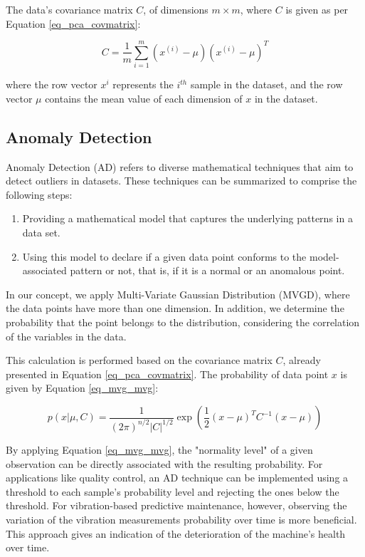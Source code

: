 \documentclass[conference]{IEEEtran}
\begin{document}
The data's covariance matrix $C$, of dimensions $m \times m$, where $C$ is given as per Equation \ref{eq_pca_covmatrix}:

\begin{equation}
	\label{eq_pca_covmatrix}
	C=\frac{1}{m}\sum_{i = 1}^{m}(x^{(i)}-\mu)(x^{(i)}-\mu)^{T}   
\end{equation}

where the row vector $x^{i}$ represents the $i^{th}$ sample in the dataset, and the row vector $\mu$ contains the mean value of each dimension of $x$ in the dataset. 

\subsection{Anomaly Detection}
\label{sec_anomaly_detection}
Anomaly Detection (AD) refers to diverse mathematical techniques that aim to detect outliers in datasets. These techniques can be summarized to comprise the following steps: 

\begin{enumerate}
	\item Providing a mathematical model that captures the underlying patterns in a data set.
	\item Using this model to declare if a given data point conforms to the model-associated pattern or not, that is, if it is a normal or an anomalous point.
\end{enumerate}

In our concept, we apply Multi-Variate Gaussian Distribution (MVGD), where the data points have more than one dimension. In addition, we determine the probability that the point belongs to the distribution, considering the correlation of the variables in the data.

This calculation is performed based on the covariance matrix $C$, already presented in Equation \ref{eq_pca_covmatrix}. The probability of data point $x$ is given by Equation \ref{eq_mvg_mvg}:

\begin{equation}
	\label{eq_mvg_mvg}
	p(x|\mu,C)=\frac{1}{(2\pi)^{n/2}|C|^{1/2}}\exp{\left(\frac{1}{2}(x-\mu)^{T}C^{-1}(x-\mu)\right) }
\end{equation}

By applying Equation \ref{eq_mvg_mvg}, the "normality level" of a given observation can be directly associated with the resulting probability. For applications like quality control, an AD technique can be implemented using a threshold to each sample's probability level and rejecting the ones below the threshold. For vibration-based predictive maintenance, however, observing the variation of the vibration measurements probability over time is more beneficial. This approach gives an indication of the deterioration of the machine's health over time.
\end{document}
